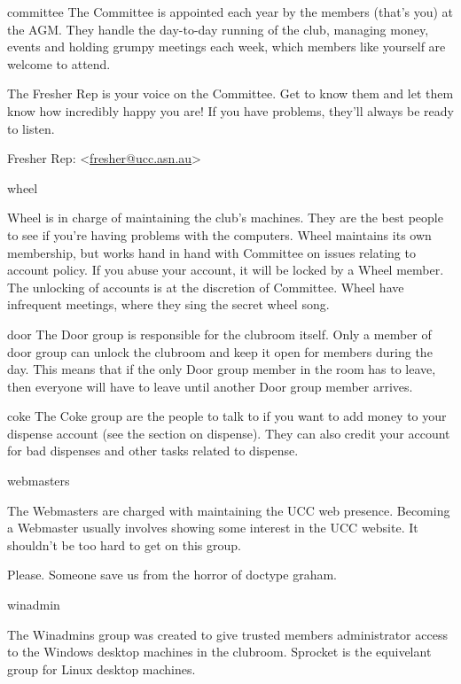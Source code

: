 \begin{uccgroup}{committee}
The Committee is appointed each year by the members (that's you) at the AGM. They handle the day-to-day running of the club, managing money, events and holding grumpy meetings each week, which members like yourself are welcome to attend.


The Fresher Rep is your voice on the Committee. Get to know them and let them know how incredibly happy you are! If you have problems, they'll always be ready to listen.

\begin{mdframed}
Fresher Rep: <\href{mailto:fresher@ucc.asn.au}{fresher@ucc.asn.au}>
\end{mdframed}
\end{uccgroup}
\pagebreak
\begin{uccgroup}{wheel}

Wheel is in charge of maintaining the club's machines. They are the best people to see if you're having problems with the computers. Wheel maintains its own membership, but works hand in hand with Committee on issues relating to account policy. If you abuse your account, it will be locked by a Wheel member. The unlocking of accounts is at the discretion of Committee. Wheel have infrequent meetings, where they sing the secret wheel song. %

\end{uccgroup}

\begin{uccgroup}{door}
The Door group is responsible for the clubroom itself. Only a member of door group can unlock the clubroom and keep it open for members during the day. This means that if the only Door group member in the room has to leave, then everyone will have to leave until another Door group member arrives.
\end{uccgroup}
\pagebreak
\begin{uccgroup}{coke}
The Coke group are the people to talk to if you want to add money to your dispense account (see the section on dispense). They can also credit your account for bad dispenses and other tasks related to dispense.
\end{uccgroup}

\begin{uccgroup}{webmasters}

The Webmasters are charged with maintaining the UCC web presence. Becoming a Webmaster usually involves showing some interest in the UCC website. It shouldn't be too hard to get on this group.

 Please. Someone save us from the horror of doctype graham.
\end{uccgroup}

\begin{uccgroup}{winadmin}

The Winadmins group was created to give trusted members administrator access to the Windows desktop machines in the clubroom. Sprocket is the equivelant group for Linux desktop machines.
\end{uccgroup}






